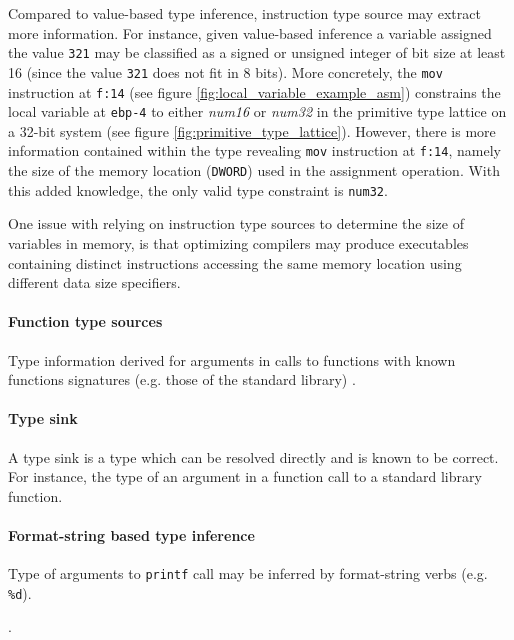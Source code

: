 Compared to value-based type inference, instruction type source may extract more information. For instance, given value-based inference a variable assigned the value \texttt{321} may be classified as a signed or unsigned integer of bit size at least 16 (since the value \texttt{321} does not fit in 8 bits). More concretely, the \texttt{mov} instruction at \texttt{f:14} (see figure \ref{fig:local_variable_example_asm}) constrains the local variable at \texttt{ebp-4} to either \textit{num16} or \textit{num32} in the primitive type lattice on a 32-bit system (see figure \ref{fig:primitive_type_lattice}). However, there is more information contained within the type revealing \texttt{mov} instruction at \texttt{f:14}, namely the size of the memory location (\texttt{DWORD}) used in the assignment operation. With this added knowledge, the only valid type constraint is \texttt{num32}.

One issue with relying on instruction type sources to determine the size of variables in memory, is that optimizing compilers may produce executables containing distinct instructions accessing the same memory location using different data size specifiers.





\paragraph{Function type sources}

Type information derived for arguments in calls to functions with known functions signatures (e.g. those of the standard library) \cite{type_inference_on_executables}.


\paragraph{Type sink}

A type sink is a type which can be resolved directly and is known to be correct. For instance, the type of an argument in a function call to a standard library function.


\paragraph{Format-string based type inference}


Type of arguments to \texttt{printf} call may be inferred by format-string verbs (e.g. \texttt{\%d}).

.
